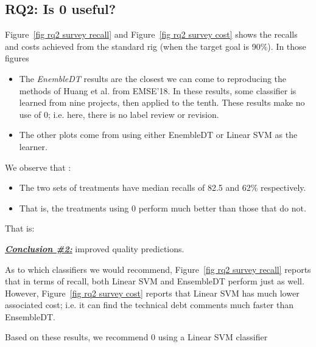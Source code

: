 \documentclass[10pt,conference]{IEEEtran}
\newcommand{\bi}{\begin{itemize}}
\newcommand{\ei}{\end{itemize}}
\newenvironment{result}[2]
{\begin{myshadowbox}\textbf{\textit{\underline{Conclusion \##1:}}} #2}{ 
\end{myshadowbox}}
\begin{document}



\subsection{RQ2: Is {\IT}0 useful?}
Figure~\ref{fig rq2 survey recall}
and 
Figure~\ref{fig rq2 survey cost} shows the recalls and costs achieved from the standard rig 
(when the target goal is 90\%). In those figures
\bi
\item The {\em EnembleDT} results are the closest we can come to reproducing
the methods of Huang et al. from EMSE'18. In these results, some classifier is learned
from nine projects, then applied to the tenth. These results make no use of {\IT}0;
i.e. here, there is no label review or revision. 
\item
The other plots come from {} using either EnembleDT or Linear SVM as the learner.
\ei
We observe that :
\bi
\item
The  two sets of treatments have median recalls of 82.5 and 62\% respectively.
\item
That is,
the treatments using {\IT}0 perform much better than those that do not.
\ei
That is:
\begin{result}{2}
{\IT}0 improved quality predictions. 
\end{result}
As to which classifiers we would recommend, Figure~\ref{fig rq2 survey recall}
reports that in terms of recall, both Linear SVM and EnsembleDT
perform just as well. However, Figure~\ref{fig rq2 survey cost} 
reports that Linear SVM has much lower associated cost; i.e. it can find
the technical debt comments much faster than EnsembleDT.

Based on these results, we  recommend {\IT}0
using a Linear SVM classifier
 

 
\end{document}
